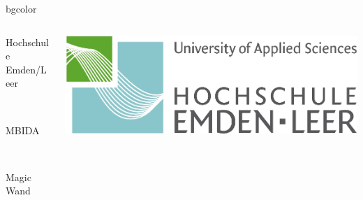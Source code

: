 {%
\begin{beamercolorbox}[rounded=true, center]{bgcolor}
\begin{columns}[T]
\begin{column}{9cm}
{\color{gray}\begin{tiny}Hochschule Emden/Leer\end{tiny}} \\ 
{\color{gray}\begin{tiny}MBIDA \end{tiny}} \\
{\color{gray}\begin{tiny}Magic Wand\end{tiny}} \\
\end{column}
\begin{column}{2cm}
\includegraphics[scale=0.25]{img/technik.jpg}
\end{column}
\end{columns}
\end{beamercolorbox}
 }
\insertsectionhead
\insertsubsectionhead
{}
\usebackgroundtemplate
{%
      \rule{0pt}{\paperheight}%
      \hspace*{\paperwidth}%
 }

